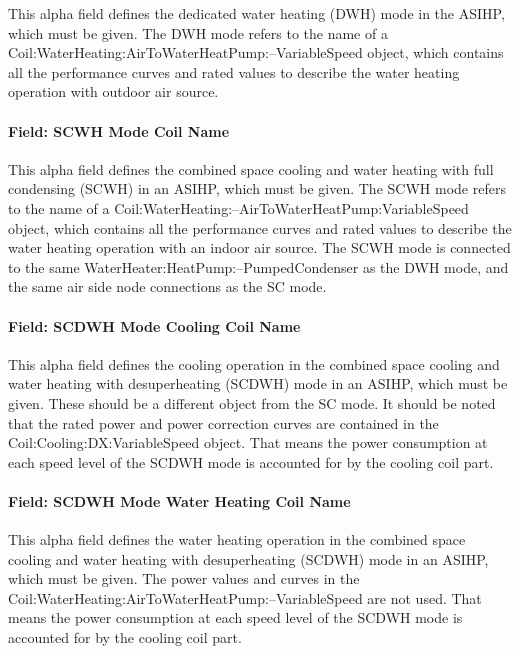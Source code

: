 This alpha field defines the dedicated water heating (DWH) mode in the ASIHP, which must be given. The DWH mode refers to the name of a Coil:WaterHeating:AirToWaterHeatPump:--VariableSpeed object, which contains all the performance curves and rated values to describe the water heating operation with outdoor air source. 

\paragraph{Field: SCWH Mode Coil Name}\label{Field-SCWH-Mode-Coil-Name-ASIHP}

This alpha field defines the combined space cooling and water heating with full condensing (SCWH) in an ASIHP, which must be given. The SCWH mode refers to the name of a Coil:WaterHeating:--AirToWaterHeatPump:VariableSpeed object, which contains all the performance curves and rated values to describe the water heating operation with an indoor air source. The SCWH mode is connected to the same WaterHeater:HeatPump:--PumpedCondenser as the DWH mode, and the same air side node connections as the SC mode. 

\paragraph{Field: SCDWH Mode Cooling Coil Name}\label{Field-SCDWH-Mode-Cooling-Coil-Name-ASIHP}

This alpha field defines the cooling operation in the combined space cooling and water heating with desuperheating (SCDWH) mode in an ASIHP, which must be given. These should be a different object from the SC mode. It should be noted that the rated power and power correction curves are contained in the Coil:Cooling:DX:VariableSpeed object. That means the power consumption at each speed level of the SCDWH mode is accounted for by the cooling coil part.

\paragraph{Field: SCDWH Mode Water Heating Coil Name}\label{Field-SCDWH-Mode-Water-Heating-Coil-Name-ASIHP}

This alpha field defines the water heating operation in the combined space cooling and water heating with desuperheating (SCDWH) mode in an ASIHP, which must be given. The power values and curves in the Coil:WaterHeating:AirToWaterHeatPump:--VariableSpeed are not used. That means the power consumption at each speed level of the SCDWH mode is accounted for by the cooling coil part.

